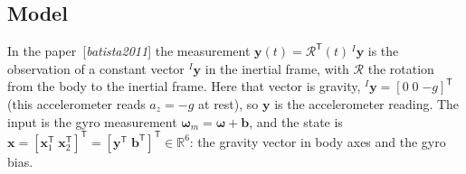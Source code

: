 \documentclass[11pt]{article}
\newcommand{\vect}[1]{\mathbf{#1}}
\renewcommand{\cite}[1]{[\textit{#1}]}
\begin{document}
\subsection{Model}
\label{sec:model}

In the paper~\cite{batista2011} the measurement $\vect{y}(t)=\mathcal{R}^{\mathsf T}(t)\,{}^{I}\vect{y}$ is the observation of a constant vector ${}^{I}\vect{y}$ in the inertial frame, with $\mathcal{R}$ the rotation from the body to the inertial frame.
Here that vector is gravity, ${}^{I}\vect{y}=[0\;0\;{-g}]^{\mathsf T}$ (this accelerometer reads $a_z=-g$ at rest), so $\vect{y}$ is the accelerometer reading.
The input is the gyro measurement $\vect{\omega}_m=\vect{\omega}+\vect{b}$, and the state is $\vect{x}=[\vect{x}_1^{\mathsf T}\;\vect{x}_2^{\mathsf T}]^{\mathsf T}=[\vect{y}^{\mathsf T}\;\vect{b}^{\mathsf T}]^{\mathsf T}\in\mathbb{R}^6$: the gravity vector in body axes and the gyro bias.
\end{document}

